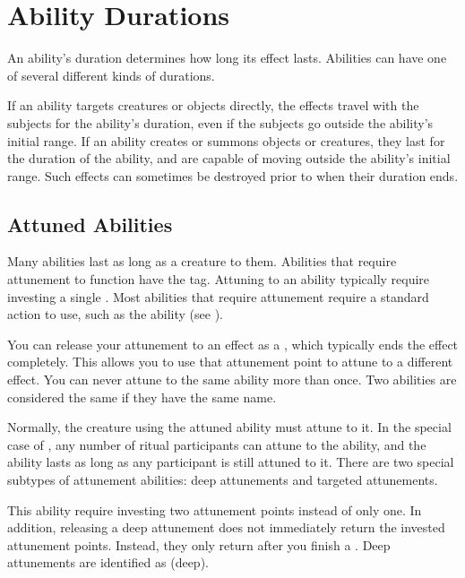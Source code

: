\section{Ability Durations}\label{Ability Durations}

  An ability's duration determines how long its effect lasts.
  Abilities can have one of several different kinds of durations.

  If an ability targets creatures or objects directly, the effects travel with the subjects for the ability's duration, even if the subjects go outside the ability's initial range.
  If an ability creates or summons objects or creatures, they last for the duration of the ability, and are capable of moving outside the ability's initial range.
  Such effects can sometimes be destroyed prior to when their duration ends.

  \subsection{Attuned Abilities}\label{Attuned Abilities}
    Many abilities last as long as a creature  to them.
    Abilities that require attunement to function have the  tag.
    Attuning to an ability typically require investing a single .
    Most abilities that require attunement require a standard action to use, such as the  ability (see ).

    You can release your attunement to an effect as a , which typically ends the effect completely.
    This allows you to use that attunement point to attune to a different effect.
    You can never attune to the same ability more than once.
    Two abilities are considered the same if they have the same name.

    Normally, the creature using the attuned ability must attune to it.
    In the special case of , any number of ritual participants can attune to the ability, and the ability lasts as long as any participant is still attuned to it.
    There are two special subtypes of attunement abilities: deep attunements and targeted attunements.

     This ability require investing two attunement points instead of only one.
    In addition, releasing a deep attunement does not immediately return the invested attunement points.
    Instead, they only return after you finish a .
    Deep attunements are identified as  (deep).


